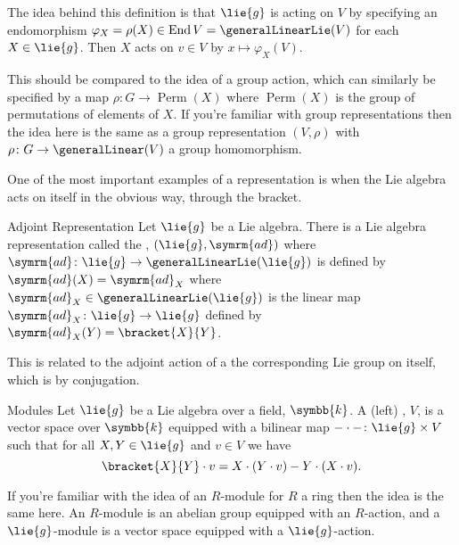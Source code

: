 \documentclass[fleqn]{NotesClass}
\renewcommand{\field}{\symbb{k}}
\DeclareMathOperator{\End}{End}
\newcommand{\ad}{\symrm{ad}}
\DeclareMathOperator{\Perm}{Perm}
\begin{document}
    The idea behind this definition is that \(\lie{g}\) is acting on \(V\) by specifying an endomorphism \(\varphi_X = \rho(X) \in \End V = \generalLinearLie(V)\) for each \(X \in \lie{g}\).
    Then \(X\) acts on \(v \in V\) by \(x \mapsto \varphi_X(V)\).
    
    This should be compared to the idea of a group action, which can similarly be specified by a map \(\rho \colon G \to \Perm(X)\) where \(\Perm(X)\) is the group of permutations of elements of \(X\).
    If you're familiar with group representations then the idea here is the same as a group representation \((V, \rho)\) with \(\rho \colon G \to \generalLinear(V)\) a group homomorphism.
    
    One of the most important examples of a representation is when the Lie algebra acts on itself in the obvious way, through the bracket.
    
    \begin{dfn}{Adjoint Representation}{}
        Let \(\lie{g}\) be a Lie algebra.
        There is a Lie algebra representation called the , \((\lie{g}, \ad)\) where \(\ad \colon \lie{g} \to \generalLinearLie(\lie{g})\) is defined by \(\ad(X) = \ad_X\) where \(\ad_X \in \generalLinearLie(\lie{g})\) is the linear map \(\ad_X \colon \lie{g} \to \lie{g}\) defined by \(\ad_X(Y) = \bracket{X}{Y}\).
    \end{dfn}
    
    This is related to the adjoint action of a the corresponding Lie group on itself, which is by conjugation.
    
    \begin{dfn}{Modules}{}
        Let \(\lie{g}\) be a Lie algebra over a field, \(\field\).
        A (left) , \(V\), is a vector space over \(\field\) equipped with a bilinear map \({-} \cdot {-} \colon \lie{g} \times V\) such that for all \(X, Y \in \lie{g}\) and \(v \in V\) we have
        \begin{equation}
            \bracket{X}{Y} \cdot v = X \cdot (Y \cdot v) - Y \cdot (X \cdot v).
        \end{equation}
    \end{dfn}
    
    If you're familiar with the idea of an \(R\)-module for \(R\) a ring then the idea is the same here.
    An \(R\)-module is an abelian group equipped with an \(R\)-action, and a \(\lie{g}\)-module is a vector space equipped with a \(\lie{g}\)-action.
    
\end{document}
